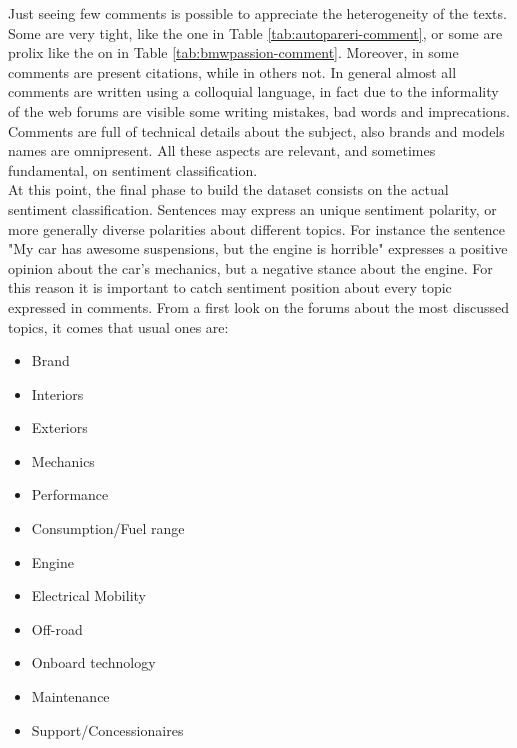 Just seeing few comments is possible to appreciate the heterogeneity of the texts. Some are very tight, like the one in Table \ref{tab:autopareri-comment}, or some are prolix like the on in Table \ref{tab:bmwpassion-comment}. Moreover, in some comments are present citations, while in others not. In general almost all comments are written using a colloquial language, in fact due to the informality of the web forums are visible some writing mistakes, bad words and imprecations. Comments are full of technical details about the subject, also brands and models names are omnipresent. All these aspects are relevant, and sometimes fundamental, on sentiment classification.\\

At this point, the final phase to build the dataset consists on the actual sentiment classification. Sentences may express an unique sentiment polarity, or more generally diverse polarities about different topics. For instance the sentence "My car has awesome suspensions, but the engine is horrible" expresses a positive opinion about the car's mechanics, but a negative stance about the engine. For this reason it is important to catch sentiment position about every topic expressed in comments. From a first look on the forums about the most discussed topics, it comes that usual ones are:

\begin{itemize}
	\item Brand
	\item Interiors
	\item Exteriors
	\item Mechanics
	\item Performance
	\item Consumption/Fuel range
	\item Engine
	\item Electrical Mobility
	\item Off-road
	\item Onboard technology
	\item Maintenance
	\item Support/Concessionaires
\end{itemize}

